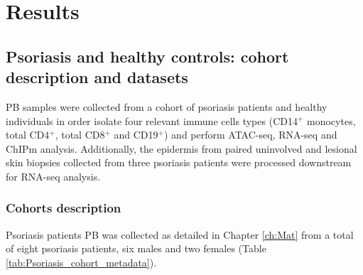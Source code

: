
\section{Results}
\subsection{Psoriasis and healthy controls: cohort description and datasets}
PB samples were collected from a cohort of psoriasis patients and healthy individuals in order isolate four relevant immune cells types (CD14$^+$ monocytes, total CD4$^+$, total CD8$^+$ and CD19$^+$) and perform ATAC-seq, RNA-seq and ChIPm analysis. Additionally, the epidermis from paired uninvolved and lesional skin biopsies collected from three psoriasis patients were processed downstream for RNA-seq analysis.

\subsubsection{Cohorts description}

Psoriasis patients PB was collected as detailed in Chapter \ref{ch:Mat} from a total of eight psoriasis patients, six males and two females (Table \ref{tab:Psoriasis_cohort_metadata}). 


